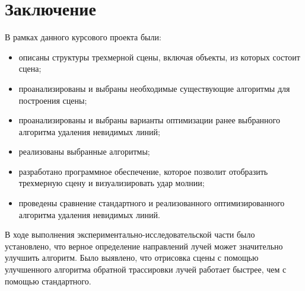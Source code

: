 \chapter*{Заключение}

В рамках данного курсового проекта были:%

\begin{itemize}
	\item описаны структуры трехмерной сцены, включая объекты, из которых состоит сцена;
	\item проанализированы и выбраны необходимые существующие алгоритмы для построения сцены;
	\item проанализированы и выбраны варианты оптимизации ранее выбранного алгоритма удаления невидимых линий;
	\item реализованы выбранные алгоритмы;
	\item разработано программное обеспечение, которое позволит отобразить трехмерную сцену и визуализировать удар молнии;
	\item проведены сравнение стандартного и реализованного оптимизированного алгоритма удаления невидимых линий.
\end{itemize}
 


В ходе выполнения экспериментально-исследовательской части было установлено, что верное определение направлений лучей может значительно улучшить алгоритм. Было выявлено, что отрисовка сцены с помощью улучшенного алгоритма обратной трассировки лучей работает быстрее, чем с помощью стандартного. 

